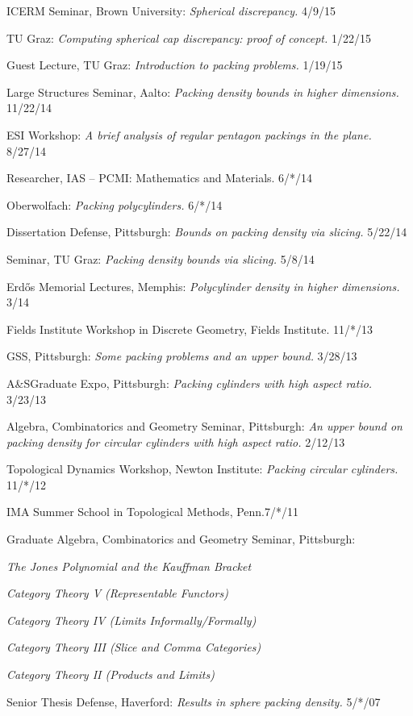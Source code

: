 \documentclass[10pt]{article}
\newenvironment{innerlist}[1][\enskip\textbullet]%
        {\begin{compactitem}[#1]}{\end{compactitem}}
\begin{document}
\begin{innerlist}[-]
\item ICERM Seminar, Brown University: \emph{Spherical discrepancy.}  4/9/15
\item TU Graz: \emph{Computing spherical cap discrepancy: proof of concept.} 1/22/15
\item Guest Lecture, TU Graz: \emph{Introduction to packing problems.} 1/19/15
\item Large Structures Seminar, Aalto: \emph{Packing density bounds in higher dimensions.} 11/22/14
\item ESI Workshop: \emph{A brief analysis of regular pentagon packings in the plane.} 8/27/14
\item Researcher, IAS -- PCMI: Mathematics and Materials. 6/*/14
\item Oberwolfach: \emph{Packing polycylinders.} 6/*/14
\item Dissertation Defense, Pittsburgh: \emph{Bounds on packing density via slicing.} 5/22/14
\item Seminar, TU Graz: \emph{Packing density bounds via slicing.} 5/8/14
\item Erd\H{o}s Memorial Lectures, Memphis: \emph{%
Polycylinder density in higher dimensions.} 3/14
\item Fields Institute Workshop in Discrete Geometry, Fields Institute. 11/*/13
\item GSS, Pittsburgh: \emph{Some packing problems and an upper bound.}  3/28/13
\item A\&SGraduate Expo, Pittsburgh:  \emph{Packing cylinders with high aspect ratio.}  3/23/13
\item Algebra, Combinatorics and Geometry Seminar, Pittsburgh: \emph{An upper bound on packing density for circular cylinders with high aspect ratio.} 2/12/13
\item Topological Dynamics Workshop, Newton Institute:  \emph{Packing circular cylinders.}  11/*/12
\item IMA Summer School in Topological Methods, Penn.7/*/11
\item Graduate Algebra, Combinatorics and Geometry Seminar, Pittsburgh:
 \begin{innerlist}
		\item \emph{The Jones Polynomial and the Kauffman Bracket }
		\item \emph{Category Theory V (Representable Functors)}
		\item \emph{Category Theory IV (Limits Informally/Formally)}
		\item \emph{Category Theory III (Slice and Comma Categories)}
		\item \emph{Category Theory II (Products and Limits)}
\end{innerlist}
\item Senior Thesis Defense, Haverford: \emph{Results in sphere packing density.} 5/*/07
\end{innerlist}
\end{document}
